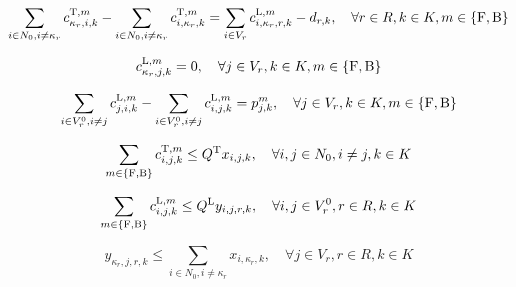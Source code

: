 \begin{linenomath}
    \begin{equation}
        \sum_{i \in N_0, i \neq \kappa_r} c_{\kappa_r,i, k}^{\text{T},m} - \sum_{i \in N_0, i \neq \kappa_r} c_{i,\kappa_r, k}^{\text{T},m} = \sum_{i \in V_r} c_{i,\kappa_r,r, k}^{\text{L},m} - d_{r,k}, \quad \forall r \in R, k \in K, m \in \{\text{F},\text{B}\} \label{eq:truck_inventory}
    \end{equation}
\end{linenomath}


\begin{linenomath}
    \begin{equation}
        c_{\kappa_r,j,k}^{\text{L},m} = 0, \quad \forall j \in V_r, k \in K, m \in \{\text{F},\text{B}\} \label{eq:laborer_initial}
    \end{equation}
\end{linenomath}

\begin{linenomath}
    \begin{equation}
        \sum_{i \in V^0_r, i \neq j} c_{j,i,k}^{\text{L},m} - \sum_{i \in V^0_r, i \neq j} c_{i,j,k}^{\text{L},m} = p^m_{j,k}, \quad \forall j \in V_r,k \in K, m \in \{\text{F},\text{B}\} \label{eq:laborer_inventory}
    \end{equation}
\end{linenomath}


\begin{linenomath}
    \begin{equation}
        \sum_{m \in \{\text{F}, \text{B}\}}c_{i,j,k}^{\text{T},m} \leq Q^{\text{T}} x_{i,j,k}, \quad \forall i,j \in N_0, i \neq j, k \in K \label{eq:truck_capacity}
    \end{equation}
\end{linenomath}

\begin{linenomath}
    \begin{equation}
        \sum_{m \in \{\text{F}, \text{B}\}}c_{i,j,k}^{\text{L},m} \leq Q^{\text{L}} y_{i,j,r,k}, \quad \forall i,j \in V^0_r, r \in R, k \in K \label{eq:laborer_capacity}
    \end{equation}
\end{linenomath}

\begin{linenomath}
    \begin{equation}
        y_{\kappa_r,j,r,k} \leq \sum_{i \in N_0, i \neq \kappa_r} x_{i,\kappa_r,k}, \quad \forall j \in V_r, r \in R, k \in K \label{eq:coordination}
    \end{equation}
\end{linenomath}

